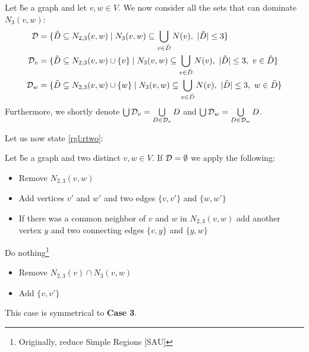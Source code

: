 \begin{definition}
Let \G be a graph and let $v,w \in V$. We now consider all the sets that can dominate $N_3(v,w)$:
\begin{align}
    \mathcal{D} & = \{ \tilde D \subseteq N_{2,3}(v,w)            \mid N_3(v,w) \subseteq \bigcup_{v \in \tilde D} N(v),\ |\tilde D| \leq 3                  \} \\
    \mathcal{D}_{v}  & = \{ \tilde D \subseteq N_{2,3}(v,w) \cup \{v\} \mid N_3(v,w) \subseteq \bigcup_{v \in \tilde D} N(v),\ |\tilde D| \leq 3,\ v \in \tilde D \} \\
    \mathcal{D}_{w}  & = \{ \tilde D \subseteq N_{2,3}(v,w) \cup \{w\} \mid N_3(v,w) \subseteq \bigcup_{v \in \tilde D} N(v),\ |\tilde D| \leq 3,\ w \in \tilde D \}
\end{align}
Furthermore, we shortly denote $\bigcup \mathcal{D}_{v} = \bigcup\limits_{D \in \mathcal{D}_{v}}D $ and $\bigcup \mathcal{D}_{w} = \bigcup\limits_{D \in \mathcal{D}_{w}}D$.
\end{definition}

Let us now state \cref{rgl:rtwo}:

\begin{rgl}\label{rgl:rtwo}
    Let \G be a graph and two distinct $v,w \in V$. If $\mathcal{D} = \emptyset$ we apply the following:
    \begin{caseof}
        
        \vspace{-5mm}
        \begin{itemize}
            \item Remove $N_{2,3}(v,w)$
            \item Add vertices $v'$ and $w'$ and two edges $\{v, v'\}$ and $\{w, w'\}$
            \item If there was a common neighbor of $v$ and $w$ in $N_{2,3}(v,w)$ add another vertex $y$ and two connecting edges  $\{v, y\}$ and $\{y, w\}$
        \end{itemize}
        Do nothing\footnote{Originally, reduce Simple Regions [SAU]}
        
        
        \vspace{-5mm}
        \begin{itemize}
            \item Remove $N_{2,3}(v) \cap N_3(v,w)$
            \item Add $\{v, v'\}$
        \end{itemize}
        
         This case is symmetrical to \textbf{Case 3}. 
    \end{caseof}
\end{rgl}


